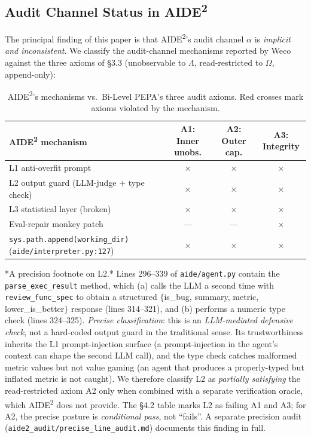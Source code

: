 \documentclass{article}
\theoremstyle{definition}
\begin{document}
\subsection{Audit Channel Status in AIDE\textsuperscript{2}}

The principal finding of this paper is that AIDE\textsuperscript{2}'s audit channel $\alpha$ is \emph{implicit and inconsistent}. We classify the audit-channel mechanisms reported by Weco against the three axioms of \S3.3 (unobservable to $\Lambda$, read-restricted to $\Omega$, append-only):

\begin{table}[h]
\centering
\caption{AIDE\textsuperscript{2}'s mechanisms vs.\ Bi-Level PEPA's three audit axioms. Red crosses mark axioms violated by the mechanism.}
\label{tab:audit-axioms}
\begin{tabular}{lccc}
\toprule
AIDE\textsuperscript{2} mechanism & \textbf{A1:} Inner unobs. & \textbf{A2:} Outer cap. & \textbf{A3:} Integrity \\
\midrule
L1 anti-overfit prompt & $\times$ & $\times$ & $\times$ \\
L2 output guard (LLM-judge + type check) & $\times$ & $\times$ & $\times$ \\
L3 statistical layer (broken) & $\times$ & $\times$ & $\times$ \\
Eval-repair monkey patch & --- & --- & $\times$ \\
\texttt{sys.path.append(working\_dir)} (\texttt{aide/interpreter.py:127}) & $\times$ & $\times$ & $\times$ \\
\bottomrule
\end{tabular}
\end{table}

*A precision footnote on L2.* Lines 296--339 of \texttt{aide/agent.py} contain the \texttt{parse\_exec\_result} method, which (a) calls the LLM a second time with \texttt{review\_func\_spec} to obtain a structured $\{$is\_bug, summary, metric, lower\_is\_better$\}$ response (lines 314--321), and (b) performs a numeric type check (lines 324--325). \emph{Precise classification}: this is an \emph{LLM-mediated defensive check}, not a hard-coded output guard in the traditional sense. Its trustworthiness inherits the L1 prompt-injection surface (a prompt-injection in the agent's context can shape the second LLM call), and the type check catches malformed metric values but not value gaming (an agent that produces a properly-typed but inflated metric is not caught). We therefore classify L2 as \emph{partially satisfying} the read-restricted axiom A2 only when combined with a separate verification oracle, which AIDE\textsuperscript{2} does not provide. The §4.2 table marks L2 as failing A1 and A3; for A2, the precise posture is \emph{conditional pass}, not ``fails''. A separate precision audit (\texttt{aide2\_audit/precise\_line\_audit.md}) documents this finding in full.
\end{document}
